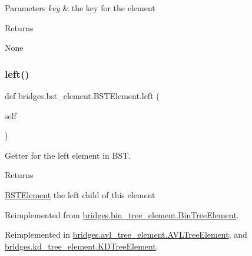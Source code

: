 \begin{DoxyParams}{Parameters}
{\em key} & the key for the element \\
\hline
\end{DoxyParams}
\begin{DoxyReturn}{Returns}


None 
\end{DoxyReturn}
\mbox{\label{classbridges_1_1bst__element_1_1_b_s_t_element_adb40ae0f98fe1cb7f153494c544d3f9f}} 
\subsubsection{\texorpdfstring{left()}{left()}\hspace{0.1cm}{\footnotesize\ttfamily [1/2]}}
{\footnotesize\ttfamily def bridges.\+bst\+\_\+element.\+B\+S\+T\+Element.\+left (\begin{DoxyParamCaption}\item[{}]{self }\end{DoxyParamCaption})}



Getter for the left element in B\+ST. 

\begin{DoxyReturn}{Returns}


\mbox{\hyperlink{classbridges_1_1bst__element_1_1_b_s_t_element}{B\+S\+T\+Element}} the left child of this element 
\end{DoxyReturn}


Reimplemented from \mbox{\hyperlink{classbridges_1_1bin__tree__element_1_1_bin_tree_element_adb99f8052ef772be4c280970e47e6e0d}{bridges.\+bin\+\_\+tree\+\_\+element.\+Bin\+Tree\+Element}}.



Reimplemented in \mbox{\hyperlink{classbridges_1_1avl__tree__element_1_1_a_v_l_tree_element_a717696b26736f5c9585fefc7c5ab88f1}{bridges.\+avl\+\_\+tree\+\_\+element.\+A\+V\+L\+Tree\+Element}}, and \mbox{\hyperlink{classbridges_1_1kd__tree__element_1_1_k_d_tree_element_afa4f059c61b3cd9460199c9835641db2}{bridges.\+kd\+\_\+tree\+\_\+element.\+K\+D\+Tree\+Element}}.

\mbox{\label{classbridges_1_1bst__element_1_1_b_s_t_element_a0b45e63b73faabb6b969dd6222e07942}} 
